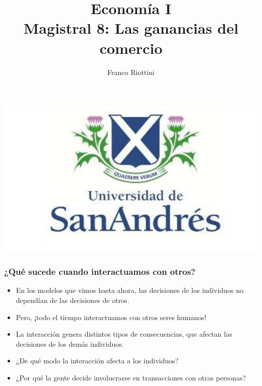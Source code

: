 \documentclass{beamer}
\title[Economía I]{Economía I \vspace{4mm}
\\ Magistral 8: Las ganancias del comercio}
\date{}
\author[Riottini]{Franco Riottini}
\institute[]{Universidad de San Andrés}
\begin{document}
\begin{frame}
\titlepage
\centering
\includegraphics[scale=0.2]{../Figures/logoUDESA.jpg} 
\end{frame}


\begin{frame}
\frametitle{¿Qué sucede cuando interactuamos con otros?}
\begin{itemize}
    \item En los modelos que vimos hasta ahora, las decisiones de los individuos no dependían de las decisiones de otros.
    \item Pero, ¡todo el tiempo interactuamos con otros seres humanos!
    \item La interacción genera distintos tipos de consecuencias, que afectan las decisiones de los demás individuos.
    \item ¿De qué modo la interacción afecta a los individuos? 
    \item ¿Por qué la gente decide involucrarse en transacciones con otras personas?
\end{itemize} 
\end{frame}
\end{document}
